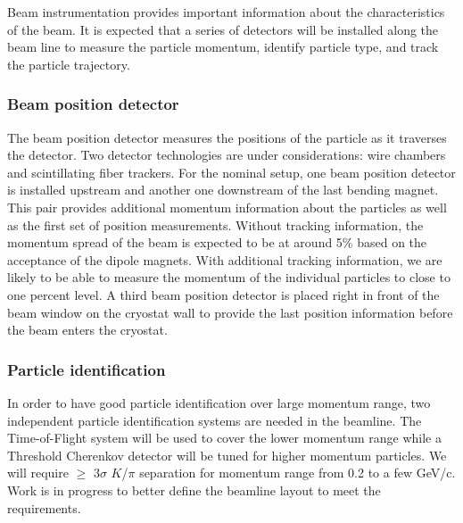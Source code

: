 
\label{beaminstrument}
Beam instrumentation provides important information about the characteristics of the beam. It is expected that a series of detectors will be installed along the beam line to measure the particle momentum, identify particle type, and track the particle trajectory.

\subsubsection{Beam position detector}
The beam position detector measures the positions of the particle as it traverses the detector. Two detector technologies are under considerations: wire chambers and scintillating fiber trackers. For the nominal setup, one beam position detector is installed upstream and another one downstream of the last bending magnet. This pair provides additional momentum information about the particles as well as the first set of position measurements. Without tracking information, the momentum spread of the beam is expected to be at around 5\% based on the acceptance of the dipole magnets. With additional tracking information, we are likely to be able to measure the momentum of the individual particles to close to one percent level. A third beam position detector is placed right in front of the beam window on the cryostat wall to provide the last position information before the beam enters the cryostat.

\subsubsection{Particle identification}
In order to have good particle identification over large momentum range, two independent particle identification systems are needed in the beamline. The Time-of-Flight system will be used to cover the lower momentum range while a Threshold Cherenkov detector will be tuned for higher momentum particles. We will require $\geq$ 3$\sigma$ $K$/$\pi$ separation for momentum range from 0.2 to a few GeV/c. Work is in progress to better define the beamline layout to meet the requirements.

